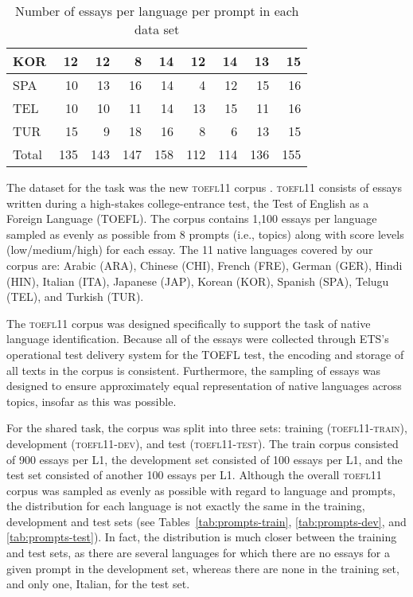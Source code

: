 \documentclass[11pt,letterpaper]{article}
\begin{document}
\begin{table*}[!ht]
\begin{small}
\begin{center}
{\begin{tabular}{lrrrrrrrr}
            KOR     &   12 & 12 & 8  & 14 & 12 & 14 & 13 & 15 \\ \hline
            SPA    &   10 & 13 & 16 & 14 & 4  & 12 & 15 & 16 \\ \hline
            TEL     &   10 & 10 & 11 & 14 & 13 & 15 & 11 & 16 \\ \hline
            TUR    &   15 & 9  & 18 & 16 & 8  & 6  & 13 & 15 \\ \hline \hline
            Total      &   135&143 & 147& 158& 112& 114& 136& 155 \\ \hline
        \end{tabular}
}
\end{center}
\end{small}
\caption{Number of essays per language per prompt in each data set}
\end{table*}

The dataset for the task was the new \textsc{toefl11} corpus
\cite{blanchard-tetreault-higgins-cahill-chodorow:2013:TOEFL11-RR}. \textsc{toefl11}
consists of essays written during a high-stakes college-entrance test, the Test
of English as a Foreign Language (TOEFL\textsuperscript{\textregistered}). The
corpus contains 1,100 essays per language sampled as evenly as possible from 8
prompts (i.e., topics) along with score levels (low/medium/high) for each essay.
The 11 native languages covered by our corpus are: Arabic (ARA), Chinese
(CHI), French (FRE), German (GER), Hindi (HIN), Italian (ITA), Japanese
(JAP), Korean (KOR), Spanish (SPA), Telugu (TEL), and Turkish (TUR).

The \textsc{toefl11} corpus was designed specifically to support the task of native
language identification.  Because all of the essays were collected through ETS's
operational test delivery system for the TOEFL\textsuperscript{\textregistered}
test, the encoding and storage of all texts in the corpus is consistent.
Furthermore, the sampling of essays was designed to ensure approximately equal
representation of native languages across topics, insofar as this was possible.

For the shared task, the corpus was split into three sets: training (\textsc{toefl11-train}),
development (\textsc{toefl11-dev}), and test (\textsc{toefl11-test}). The train corpus consisted
of 900 essays per L1, the development set consisted of 100 essays per L1,
and the test set consisted of another 100 essays per L1.
Although the overall \textsc{toefl11} corpus was sampled as evenly
as possible with regard to language and prompts, the distribution for each
language is not exactly the same in the training, development and test sets (see
Tables~\ref{tab:prompts-train}, \ref{tab:prompts-dev}, and
\ref{tab:prompts-test}). In fact, the distribution is much closer between the
training and test sets, as there are several languages for which there are no
essays for a given prompt in the development set, whereas there are none in the
training set, and only one, Italian, for the test set.
\end{document}

